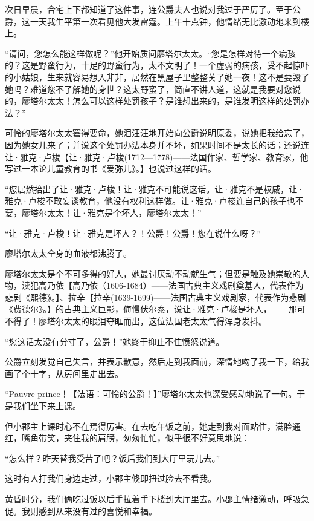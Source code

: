 \documentclass[12pt, UTF8]{ctexbook}
\begin{document}
\par 次日早晨，合宅上下都知道了这件事，连公爵夫人也说对我过于严厉了。至于公爵，这一天我生平第一次看见他大发雷霆。上午十点钟，他情绪无比激动地来到楼上。
\par “请问，您怎么能这样做呢？”他开始质问廖塔尔太太。“您是怎样对待一个病孩的？这是野蛮行为，十足的野蛮行为，太不文明了！一个虚弱的病孩，受不起惊吓的小姑娘，生来就容易想入非非，居然在黑屋子里整整关了她一夜！这不是要毁了她吗？难道您不了解她的身世？这太野蛮了，简直不讲人道，这就是我要对您说的，廖塔尔太太！怎么可以这样处罚孩子？是谁想出来的，是谁发明这样的处罚办法？”
\par 可怜的廖塔尔太太窘得要命，她泪汪汪地开始向公爵说明原委，说她把我给忘了，因为她女儿来了；并说这个处罚办法本身并不坏，如果时间不是太长的话；还说连让·雅克·卢梭【让·雅克·卢梭(1712—1778)——法国作家、哲学家、教育家，他写过一本论儿童教育的书《爱弥儿》。】也说过这样的话。
\par “您居然抬出了让·雅克·卢梭！让·雅克不可能说这话。让·雅克不是权威，让·雅克·卢梭不敢妄谈教育，他没有权利这样做。让·雅克·卢梭连自己的孩子也不要，廖塔尔太太！让·雅克是个坏人，廖塔尔太太！”
\par “让·雅克·卢梭！让·雅克是坏人？！公爵！公爵！您在说什么呀？”
\par 廖塔尔太太全身的血液都沸腾了。
\par 廖塔尔太太是个不可多得的好人，她最讨厌动不动就生气；但要是触及她崇敬的人物，渎犯高乃依【高乃依（1606-1684）——法国古典主义戏剧奠基人，代表作为悲剧《熙德》。】、拉辛【拉辛(1639-1699)——法国古典主义戏剧家，代表作为悲剧《费德尔》。】的古典主义巨影，侮慢伏尔泰，说让·雅克·卢梭是坏人，——那可不得了！廖塔尔太太的眼泪夺眶而出，这位法国老太太气得浑身发抖。
\par “您这话太没有分寸了，公爵！”她终于抑止不住愤怒说道。
\par 公爵立刻发觉自己失言，并表示歉意，然后走到我面前，深情地吻了我一下，给我画了个十字，从房间里走出去。
\par “Pauvre prince！【法语：可怜的公爵！】”廖塔尔太太也深受感动地说了一句。于是我们坐下来上课。
\par 但小郡主上课时心不在焉得厉害。在去吃午饭之前，她走到我对面站住，满脸通红，嘴角带笑，夹住我的肩膀，匆匆忙忙，似乎很不好意思地说：
\par “怎么样？昨天替我受苦了吧？饭后我们到大厅里玩儿去。”
\par 这时有人打我们身边走过，小郡主倏即扭过脸去不看我。
\par 黄昏时分，我们俩吃过饭以后手拉着手下楼到大厅里去。小郡主情绪激动，呼吸急促。我则感到从来没有过的喜悦和幸福。
\end{document}
